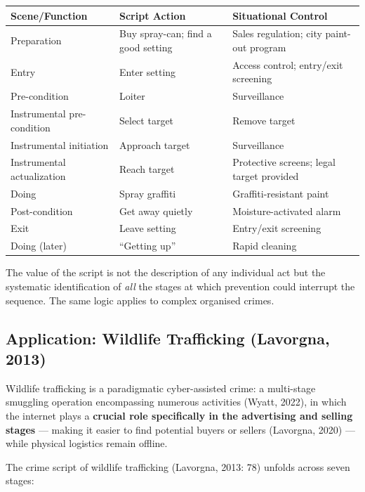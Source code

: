 \documentclass[11pt,a4paper,openany]{report}
\theoremstyle{definition}
\theoremstyle{plain}
\theoremstyle{remark}
\begin{document}
\begin{center}
\begin{tabular}{lll}
\toprule
\textbf{Scene/Function} & \textbf{Script Action} & \textbf{Situational Control} \\
\midrule
Preparation & Buy spray-can; find a good setting & Sales regulation; city paint-out program \\
Entry & Enter setting & Access control; entry/exit screening \\
Pre-condition & Loiter & Surveillance \\
Instrumental pre-condition & Select target & Remove target \\
Instrumental initiation & Approach target & Surveillance \\
Instrumental actualization & Reach target & Protective screens; legal target provided \\
Doing & Spray graffiti & Graffiti-resistant paint \\
Post-condition & Get away quietly & Moisture-activated alarm \\
Exit & Leave setting & Entry/exit screening \\
Doing (later) & ``Getting up'' & Rapid cleaning \\
\bottomrule
\end{tabular}
\end{center}

The value of the script is not the description of any individual act but the systematic identification of \textit{all} the stages at which prevention could interrupt the sequence. The same logic applies to complex organised crimes.

\subsection{Application: Wildlife Trafficking (Lavorgna, 2013)}

Wildlife trafficking is a paradigmatic cyber-assisted crime: a multi-stage smuggling operation encompassing numerous activities (Wyatt, 2022), in which the internet plays a \textbf{crucial role specifically in the advertising and selling stages} --- making it easier to find potential buyers or sellers (Lavorgna, 2020) --- while physical logistics remain offline.

The crime script of wildlife trafficking (Lavorgna, 2013: 78) unfolds across seven stages:
\end{document}
